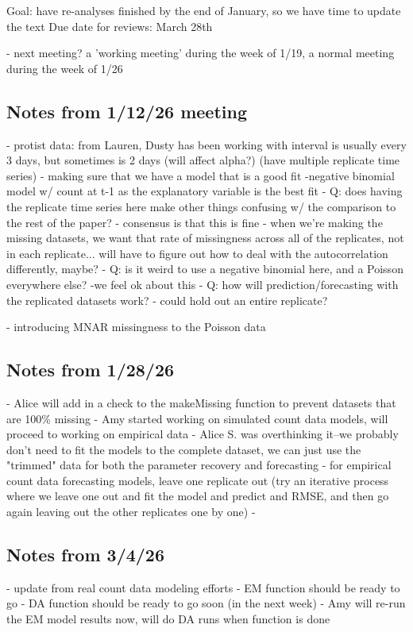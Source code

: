 \documentclass{article}
\begin{document}
Goal: have re-analyses finished by the end of January, so we have time to update the text 
Due date for reviews: March 28th 

- next meeting? a 'working meeting' during the week of 1/19, a normal meeting during the week of 1/26


\subsection{Notes from 1/12/26 meeting}
- protist data: from Lauren, Dusty has been working with
    interval is usually every 3 days, but sometimes is 2 days (will affect alpha?) (have multiple replicate time series)
    - making sure that we have a model that is a good fit -negative binomial model w/ count at t-1 as the explanatory variable is the best fit 
    - Q: does having the replicate time series here make other things confusing w/ the comparison to the rest of the paper? 
        - consensus is that this is fine 
        - when we're making the missing datasets, we want that rate of missingness across all of the replicates, not in each replicate... will have to figure out how to deal with the autocorrelation differently, maybe? 
    - Q: is it weird to use a negative binomial here, and a Poisson everywhere else? 
        -we feel ok about this
    - Q: how will prediction/forecasting with the replicated datasets work? 
        - could hold out an entire replicate? 

    - introducing MNAR missingness to the Poisson data 

\subsection{Notes from 1/28/26}
- Alice will add in a check to the makeMissing function to prevent datasets that are 100\% missing 
- Amy started working on simulated count data models, will proceed to working on empirical data
- Alice S. was overthinking it--we probably don't need to fit the models to the complete dataset, we can just use the "trimmed" data for both the parameter recovery and forecasting  
- for empirical count data forecasting models, leave one replicate out (try an iterative process where we leave one out and fit the model and predict and RMSE, and then go again leaving out the other replicates one by one)
- 

\subsection{Notes from 3/4/26}
- update from real count data modeling efforts
    - EM function should be ready to go 
    - DA function should be ready to go soon (in the next week)
            - Amy will re-run the EM model results now, will do DA runs when function is done
\end{document}
